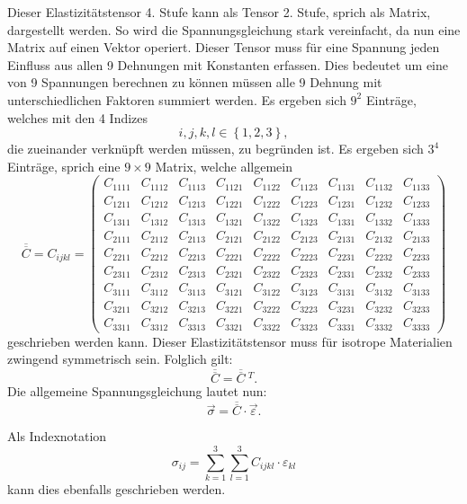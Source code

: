 Dieser Elastizitätstensor 4. Stufe kann als Tensor 2. Stufe, sprich als Matrix, dargestellt werden.
So wird die Spannungsgleichung stark vereinfacht, da nun eine Matrix auf einen Vektor operiert.
Dieser Tensor muss für eine Spannung jeden Einfluss aus allen 9 Dehnungen mit Konstanten erfassen.
Dies bedeutet um eine von 9 Spannungen berechnen zu können müssen alle 9 Dehnung mit unterschiedlichen Faktoren summiert werden.
Es ergeben sich $9^2$ Einträge, welches mit den 4 Indizes
\[
i, j, k, l\in\left\{1, 2, 3\right\}
,
\]
die zueinander verknüpft werden müssen, zu begründen ist.
Es ergeben sich $3^4$ Einträge, sprich eine $9\times9$ Matrix, welche allgemein
\[
\overline{\overline{C}}
=
C_{ijkl}
=
\begin{pmatrix}
C_{1111} & C_{1112} & C_{1113} & C_{1121} & C_{1122} & C_{1123} & C_{1131} & C_{1132} & C_{1133} \\
C_{1211} & C_{1212} & C_{1213} & C_{1221} & C_{1222} & C_{1223} & C_{1231} & C_{1232} & C_{1233} \\
C_{1311} & C_{1312} & C_{1313} & C_{1321} & C_{1322} & C_{1323} & C_{1331} & C_{1332} & C_{1333} \\
C_{2111} & C_{2112} & C_{2113} & C_{2121} & C_{2122} & C_{2123} & C_{2131} & C_{2132} & C_{2133} \\
C_{2211} & C_{2212} & C_{2213} & C_{2221} & C_{2222} & C_{2223} & C_{2231} & C_{2232} & C_{2233} \\
C_{2311} & C_{2312} & C_{2313} & C_{2321} & C_{2322} & C_{2323} & C_{2331} & C_{2332} & C_{2333} \\
C_{3111} & C_{3112} & C_{3113} & C_{3121} & C_{3122} & C_{3123} & C_{3131} & C_{3132} & C_{3133} \\
C_{3211} & C_{3212} & C_{3213} & C_{3221} & C_{3222} & C_{3223} & C_{3231} & C_{3232} & C_{3233} \\
C_{3311} & C_{3312} & C_{3313} & C_{3321} & C_{3322} & C_{3323} & C_{3331} & C_{3332} & C_{3333}
\end{pmatrix}
\]
geschrieben werden kann.
Dieser Elastizitätstensor muss für isotrope Materialien zwingend symmetrisch sein.
Folglich gilt:
\[
\overline{\overline{C}}
=
\overline{\overline{C}}~^{T}
.
\]
Die allgemeine Spannungsgleichung lautet nun:
\[
\vec\sigma
=
\overline{\overline{C}}\cdot\vec{\varepsilon}
.
\]

Als Indexnotation
\[
\sigma_{ij}
=
\sum_{k=1}^3
\sum_{l=1}^3
C_{ijkl}\cdot\varepsilon_{kl}
\]
kann dies ebenfalls geschrieben werden.

